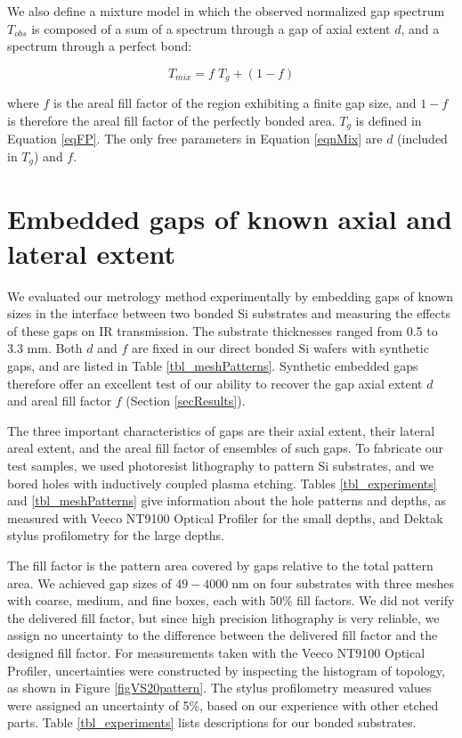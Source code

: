 \documentclass[osajnl,twocolumn,showpacs,superscriptaddress,11pt]{revtex4-1} %
\begin{document}
We also define a mixture model in which the observed normalized gap spectrum $T_{obs}$ is composed of a sum of a spectrum through a gap of axial extent $d$, and a spectrum through a perfect bond:

\begin{equation}
	T_{mix} = f\;T_{g} + (1-f) \label{eqnMix}
\end{equation}

where $f$ is the areal fill factor of the region exhibiting a finite gap size, and $1-f$ is therefore the areal fill factor of the perfectly bonded area.  $T_g$ is defined in Equation \ref{eqFP}.  The only free parameters in Equation \ref{eqnMix} are $d$ (included in $T_g$) and $f$.

\section{Embedded gaps of known axial and lateral extent}

We evaluated our metrology method experimentally by embedding gaps of known sizes in the interface between two bonded Si substrates and measuring the effects of these gaps on IR transmission.  The substrate thicknesses ranged from 0.5 to 3.3 mm.  Both $d$ and $f$ are fixed in our direct bonded Si wafers with synthetic gaps, and are listed in Table \ref{tbl_meshPatterns}.  Synthetic embedded gaps therefore offer an excellent test of our ability to recover the gap axial extent $d$ and areal fill factor $f$ (Section \ref{secResults}).

The three important characteristics of gaps are their axial extent, their lateral areal extent, and the areal fill factor of ensembles of such gaps.  To fabricate our test samples, we used photoresist lithography to pattern Si substrates, and we bored holes with inductively coupled plasma etching.  Tables \ref{tbl_experiments} and \ref{tbl_meshPatterns} give information about the hole patterns and depths, as measured with Veeco NT9100 Optical Profiler for the small depths, and Dektak stylus profilometry for the large depths.

The fill factor is the pattern area covered by gaps relative to the total pattern area.  We achieved gap sizes of $49-4000\;$nm on four substrates with three meshes with coarse, medium, and fine boxes, each with 50\% fill factors.  We did not verify the delivered fill factor, but since high precision lithography is very reliable, we assign no uncertainty to the difference between the delivered fill factor and the designed fill factor.  For measurements taken with the Veeco NT9100 Optical Profiler, uncertainties were constructed by inspecting the histogram of topology, as shown in Figure \ref{figVS20pattern}.  The stylus profilometry measured values were assigned an uncertainty of 5\%, based on our experience with other etched parts.  Table \ref{tbl_experiments} lists descriptions for our bonded substrates.
\end{document}

